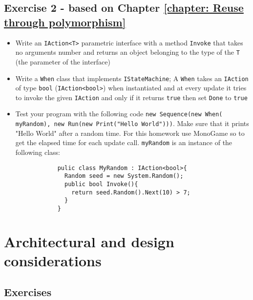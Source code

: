     \section{Exercise 2 - \small based on Chapter \ref{chapter: Reuse through polymorphism}}
	     \begin{myprop}
         \begin{itemize}
         	\item Write an \texttt{IAction<T>} parametric interface with a method \texttt{Invoke} that takes no arguments number and returns an object belonging to the type of the \texttt{T} (the parameter of the interface)
         	\item Write a \texttt{When} class that implements \texttt{IStateMachine}; A \texttt{When} takes an \texttt{IAction} of type \texttt{bool} (\texttt{IAction<bool>}) when instantiated and at every update it tries to invoke the given \texttt{IAction} and only if it returns \texttt{true} then set \texttt{Done} to \texttt{true}
         	\item Test your program with the following code \texttt{new Sequence(new When(}\\ \texttt{myRandom), new Run(new Print("Hello World")))}. Make sure that it prints "Hello World" after a random time. For this homework use MonoGame so to get the elapsed time for each update call. \texttt{myRandom} is an instance of the following class:
         	\begin{lstlisting}         	
			pulic class MyRandom : IAction<bool>{
			  Random seed = new System.Random();
			  public bool Invoke(){ 
			    return seed.Random().Next(10) > 7; 
			  }
			}
			\end{lstlisting}
		\end{itemize}
	     \end{myprop}
         	



\chapter{Architectural and design considerations}
    \section{Exercises}

